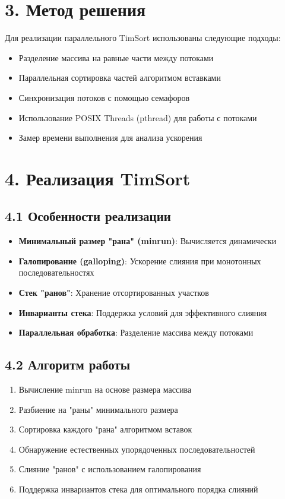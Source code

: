 \documentclass[12pt,a4paper]{article}
\begin{document}
\section*{3. Метод решения}
Для реализации параллельного TimSort использованы следующие подходы:
\begin{itemize}
    \item Разделение массива на равные части между потоками
    \item Параллельная сортировка частей алгоритмом вставками
    \item Синхронизация потоков с помощью семафоров
    \item Использование POSIX Threads (pthread) для работы с потоками
    \item Замер времени выполнения для анализа ускорения
\end{itemize}

\section*{4. Реализация TimSort}

\subsection*{4.1 Особенности реализации}
\begin{itemize}
    \item \textbf{Минимальный размер "рана" (minrun)}: Вычисляется динамически
    \item \textbf{Галопирование (galloping)}: Ускорение слияния при монотонных последовательностях
    \item \textbf{Стек "ранов"}: Хранение отсортированных участков
    \item \textbf{Инварианты стека}: Поддержка условий для эффективного слияния
    \item \textbf{Параллельная обработка}: Разделение массива между потоками
\end{itemize}

\subsection*{4.2 Алгоритм работы}
\begin{enumerate}
    \item Вычисление minrun на основе размера массива
    \item Разбиение на "раны" минимального размера
    \item Сортировка каждого "рана" алгоритмом вставок
    \item Обнаружение естественных упорядоченных последовательностей
    \item Слияние "ранов" с использованием галопирования
    \item Поддержка инвариантов стека для оптимального порядка слияний
\end{enumerate}
\end{document}
